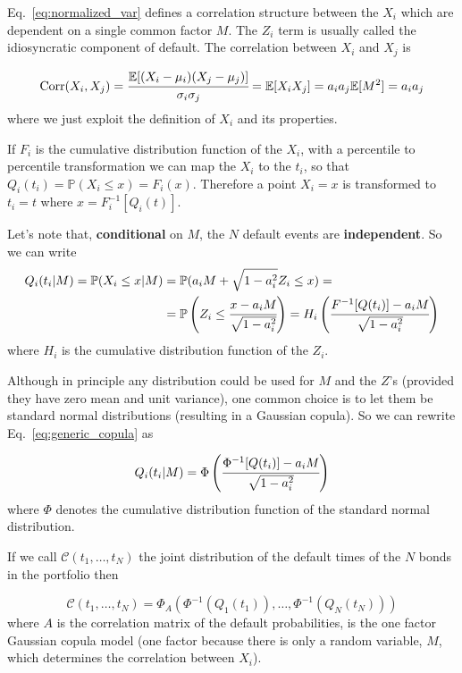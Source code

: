 Eq.~\ref{eq:normalized_var} defines a correlation structure between the
\(X_i\) which are dependent on a single common factor \(M\). The $Z_i$ term is usually 
called the idiosyncratic component of default. 
The correlation between \(X_i\) and \(X_j\) is

\[
\mathrm{Corr}(X_i, X_j) = \cfrac{\mathbb{E}[(X_i-\mu_i)(X_j-\mu_j)]}{\sigma_{i}\sigma_{j}} =\mathbb{E}[X_i X_j] = a_i a_j \mathbb{E}[M^2] = a_i a_j
\]
where we just exploit the definition of $X_i$ and its properties.

If $F_i$ is the cumulative distribution function of the $X_i$,
with a percentile to percentile transformation we can map the \(X_i\) to the \(t_i\), so that $Q_i(t_i) = \mathbb{P}(X_i\le x)=F_i(x)$.
Therefore a point \(X_i = x\) is transformed to \(t_i = t\) where
\(x = F_i^{-1}[Q_i(t)]\).

Let's note that, \textbf{conditional} on $M$, the $N$ default events are \textbf{independent}. So we can write
\begin{equation}
\begin{split}
Q_i(t_i|M) = \mathbb{P}(X_i\le x|M) &= \mathbb{P}(a_i M + \sqrt{1-a_i^2}Z_i\le x) =\\
&= \mathbb{P}\left(Z_i\le \cfrac{x-a_i M}{\sqrt{1-a_i^2}}\right)
=H_i\left(\cfrac{F^{-1}[Q(t_i)]-a_i M}{\sqrt{1-a_i^2}}\right)
\end{split}
\label{eq:generic_copula}
\end{equation}
where $H_i$ is the cumulative distribution function of the $Z_i$.

Although in principle any distribution could be used for \(M\) and the
\(Z\)'s (provided they have zero mean and unit variance), one common
choice is to let them be standard normal distributions (resulting in a
Gaussian copula).
So we can rewrite Eq.~\ref{eq:generic_copula} as

\begin{equation}
Q_i(t_i|M) = \Phi\left(\cfrac{\Phi^{-1}[Q(t_i)]-a_i M}{\sqrt{1-a_i^2}}\right)
\label{eq:gaussian_one_factor_copula}
\end{equation}
where $\Phi$ denotes the cumulative distribution function of the standard normal distribution.

If we call $\mathcal{C}(t_1,\ldots,t_N)$ the joint distribution of the default times of the $N$ bonds in the portfolio then

\[
\mathcal{C}(t_1,\ldots,t_N)=\Phi_{A}(\Phi^{-1}(Q_1(t_1)),\ldots,\Phi^{-1}(Q_N(t_N)))
\]
where $A$ is the correlation matrix of the default probabilities, is the one factor Gaussian copula model (one factor because there is only a random variable, $M$, which determines the correlation between $X_i$).

